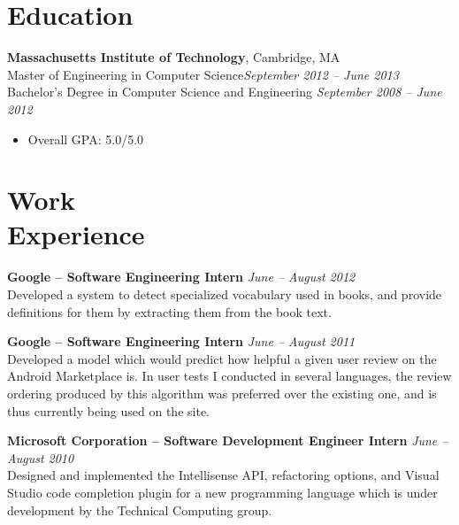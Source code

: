 \documentclass[margin,line]{resume}
\begin{document}
\vspace{-5.0mm}

\begin{resume}

\section{\mysidestyle Education}

\textbf{Massachusetts Institute of Technology}, Cambridge, MA \vspace{0mm}\\\vspace{0mm}%
Master of Engineering in Computer Science\hfill \textsl{September 2012 -- June 2013}\\\vspace{1mm}%
Bachelor's Degree in Computer Science and Engineering \hfill \textsl{September 2008 -- June 2012}\vspace{-0.8mm}
\begin{itemize}
\item Overall GPA: 5.0/5.0 \\
\end{itemize}

\vspace{-6.5mm}

\section{\mysidestyle Work\\Experience}

\textbf{Google -- Software Engineering Intern} \hfill \textsl{June -- August 2012}\\
Developed a system to detect specialized vocabulary used in books,
and provide definitions for them by extracting them from the book text.

\textbf{Google -- Software Engineering Intern} \hfill \textsl{June -- August 2011}\\
Developed a model which would predict how helpful a given user review on the Android Marketplace is.
In user tests I conducted in several languages, the review ordering produced by this algorithm
was preferred over the existing one, and is thus currently being used on the site.

\textbf{Microsoft Corporation -- Software Development Engineer Intern} \hfill \textsl{June -- August 2010}\\
Designed and implemented the Intellisense API, refactoring options, and Visual Studio code completion plugin for a new programming language which is under development by the Technical Computing group.


\end{resume}
\end{document}
